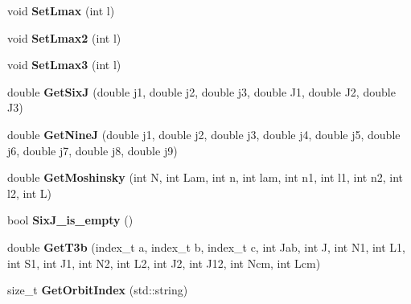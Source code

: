 \begin{DoxyCompactItemize}
\item 
\hypertarget{classModelSpace_ac378818b2f12f7f947f999aa51067261}{void {\bfseries Set\-Lmax} (int l)}\label{classModelSpace_ac378818b2f12f7f947f999aa51067261}

\item 
\hypertarget{classModelSpace_a847073aa2793e18799ddb36e6a7c32a7}{void {\bfseries Set\-Lmax2} (int l)}\label{classModelSpace_a847073aa2793e18799ddb36e6a7c32a7}

\item 
\hypertarget{classModelSpace_a426ef832829aef84c3c74fa5a0b28f29}{void {\bfseries Set\-Lmax3} (int l)}\label{classModelSpace_a426ef832829aef84c3c74fa5a0b28f29}

\item 
\hypertarget{classModelSpace_a716c2bf4a6b42c1c27579b0b7804252e}{double {\bfseries Get\-Six\-J} (double j1, double j2, double j3, double J1, double J2, double J3)}\label{classModelSpace_a716c2bf4a6b42c1c27579b0b7804252e}

\item 
\hypertarget{classModelSpace_ab9303a5a0cc4513bf4ed4430d9fe86a6}{double {\bfseries Get\-Nine\-J} (double j1, double j2, double j3, double j4, double j5, double j6, double j7, double j8, double j9)}\label{classModelSpace_ab9303a5a0cc4513bf4ed4430d9fe86a6}

\item 
\hypertarget{classModelSpace_a85f0b95b2cd46504702ea80489455beb}{double {\bfseries Get\-Moshinsky} (int N, int Lam, int n, int lam, int n1, int l1, int n2, int l2, int L)}\label{classModelSpace_a85f0b95b2cd46504702ea80489455beb}

\item 
\hypertarget{classModelSpace_aae435e6ade2addd7787e7948a3ae542c}{bool {\bfseries Six\-J\-\_\-is\-\_\-empty} ()}\label{classModelSpace_aae435e6ade2addd7787e7948a3ae542c}

\item 
\hypertarget{classModelSpace_abcb6dad2c3345b942063efde84356f3a}{double {\bfseries Get\-T3b} (index\-\_\-t a, index\-\_\-t b, index\-\_\-t c, int Jab, int J, int N1, int L1, int S1, int J1, int N2, int L2, int J2, int J12, int Ncm, int Lcm)}\label{classModelSpace_abcb6dad2c3345b942063efde84356f3a}

\item 
\hypertarget{classModelSpace_a20ee0f3ed206e68c70416ae7747e264a}{size\-\_\-t {\bfseries Get\-Orbit\-Index} (std\-::string)}\label{classModelSpace_a20ee0f3ed206e68c70416ae7747e264a}


\end{DoxyCompactItemize}
